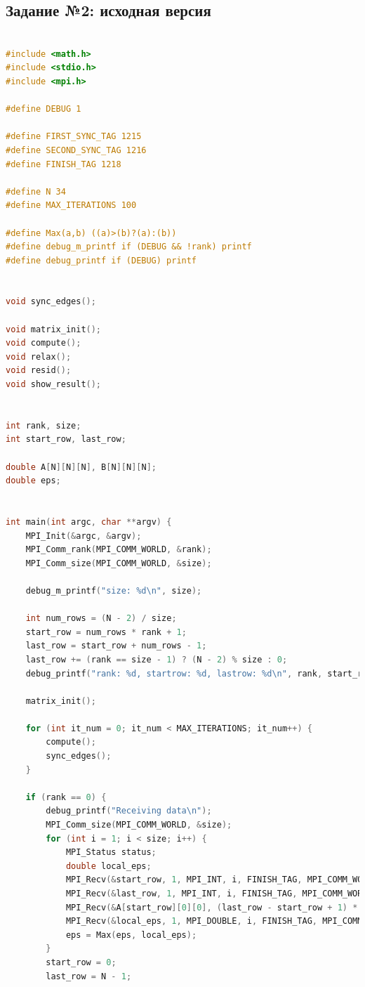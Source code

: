 \documentclass[a4paper]{article}
\begin{document}
\newpage

\subsection{Задание №2: исходная версия}

\begin{lstlisting}[caption=jac\_3d\_mpi\_noft.c, label={lst:3}, language=C]

#include <math.h>
#include <stdio.h>
#include <mpi.h>

#define DEBUG 1

#define FIRST_SYNC_TAG 1215
#define SECOND_SYNC_TAG 1216
#define FINISH_TAG 1218

#define N 34
#define MAX_ITERATIONS 100

#define Max(a,b) ((a)>(b)?(a):(b))
#define debug_m_printf if (DEBUG && !rank) printf
#define debug_printf if (DEBUG) printf


void sync_edges();

void matrix_init();
void compute();
void relax();
void resid();
void show_result();


int rank, size;
int start_row, last_row;

double A[N][N][N], B[N][N][N];
double eps;


int main(int argc, char **argv) {
    MPI_Init(&argc, &argv);
    MPI_Comm_rank(MPI_COMM_WORLD, &rank);
    MPI_Comm_size(MPI_COMM_WORLD, &size);

    debug_m_printf("size: %d\n", size);

    int num_rows = (N - 2) / size;
    start_row = num_rows * rank + 1;
    last_row = start_row + num_rows - 1;
    last_row += (rank == size - 1) ? (N - 2) % size : 0;
    debug_printf("rank: %d, startrow: %d, lastrow: %d\n", rank, start_row, last_row);

    matrix_init();

    for (int it_num = 0; it_num < MAX_ITERATIONS; it_num++) {
        compute();
        sync_edges();
    }

    if (rank == 0) {
        debug_printf("Receiving data\n");
        MPI_Comm_size(MPI_COMM_WORLD, &size);
        for (int i = 1; i < size; i++) {
            MPI_Status status;
            double local_eps;
            MPI_Recv(&start_row, 1, MPI_INT, i, FINISH_TAG, MPI_COMM_WORLD, &status);
            MPI_Recv(&last_row, 1, MPI_INT, i, FINISH_TAG, MPI_COMM_WORLD, &status);
            MPI_Recv(&A[start_row][0][0], (last_row - start_row + 1) * N * N, MPI_DOUBLE, i, FINISH_TAG, MPI_COMM_WORLD, &status);
            MPI_Recv(&local_eps, 1, MPI_DOUBLE, i, FINISH_TAG, MPI_COMM_WORLD, &status);
            eps = Max(eps, local_eps);
        }
        start_row = 0;
        last_row = N - 1;


\end{lstlisting}
\end{document}
